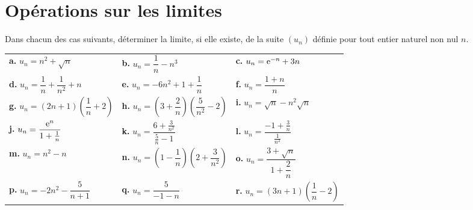 \documentclass[11pt,fleqn]{book} %
\begin{document}
\section*{Opérations sur les limites}

\begin{exercise}Dans chacun des cas suivants, déterminer la limite, si elle existe, de la suite $(u_n)$  définie pour tout entier naturel non nul $n$.

\renewcommand{\arraystretch}{2.5}
\begin{tabularx}{\linewidth}{XXX}
\textbf{a.}  $u_n= n^2+\sqrt{n}$ & \textbf{b.} $u_n = \dfrac{1}{n}-n^3$ & \textbf{c.} $u_n = \mathrm{e}^{-n}+3n$ \\
\textbf{d.} $u_n = \dfrac{1}{n} + \dfrac{1}{n^2}+n$ & \textbf{e.} $ u_n =-6n^2+1+ \dfrac{1}{n}$ & \textbf{f.} $u_n=\dfrac{1+n}{n}$\\
\textbf{g.} $u_n = (2n+1)\left(\dfrac{1}{	n}+2\right)$ & \textbf{h.} $ u_n = \left(3+\dfrac{2}{n}\right) \left( \dfrac{5}{n^2}-2\right)$ & \textbf{i.} $u_n=\sqrt{n}-n^2\sqrt{n}$\\
\textbf{j.} $ u_n = \dfrac{\mathrm{e}^n}{1+\frac{1}{n}}$ & \textbf{k.} $ u_n = \dfrac{6+\frac{3}{n^2}}{\frac{5}{n}-1}$ &
\textbf{l.} $ u_n = \dfrac{-1+\frac{3}{n}}{\frac{1}{n^2}}$ \\

\textbf{m.} $u_n=n^2-n$ & \textbf{n.} $u_n=\left(1-\dfrac{1}{n}\right)\left(2+\dfrac{3}{n^2}\right)$ & 
\textbf{o.} $u_n=\dfrac{3+\sqrt{n}}{1+\dfrac{2}{n}}$\\
\textbf{p.} $u_n=-2n^2-\dfrac{5}{n+1}$ & \textbf{q.} $u_n=\dfrac{5}{-1-n}$ & \textbf{r.} $u_n = (3n+1)\left(\dfrac{1}{n}-2\right)$
\end{tabularx}
\end{exercise}
\end{document}

